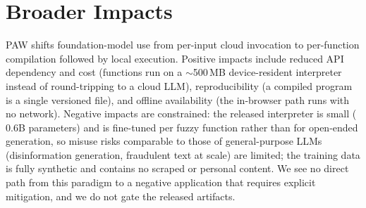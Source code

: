 \section{Broader Impacts}
\label{appendix:broader_impacts}

PAW shifts foundation-model use from per-input cloud invocation to per-function compilation followed by local execution. Positive impacts include reduced API dependency and cost (functions run on a $\sim$500\,MB device-resident interpreter instead of round-tripping to a cloud LLM), reproducibility (a compiled program is a single versioned file), and offline availability (the in-browser path runs with no network). Negative impacts are constrained: the released interpreter is small ($0.6$B parameters) and is fine-tuned per fuzzy function rather than for open-ended generation, so misuse risks comparable to those of general-purpose LLMs (disinformation generation, fraudulent text at scale) are limited; the training data is fully synthetic and contains no scraped or personal content. We see no direct path from this paradigm to a negative application that requires explicit mitigation, and we do not gate the released artifacts.


